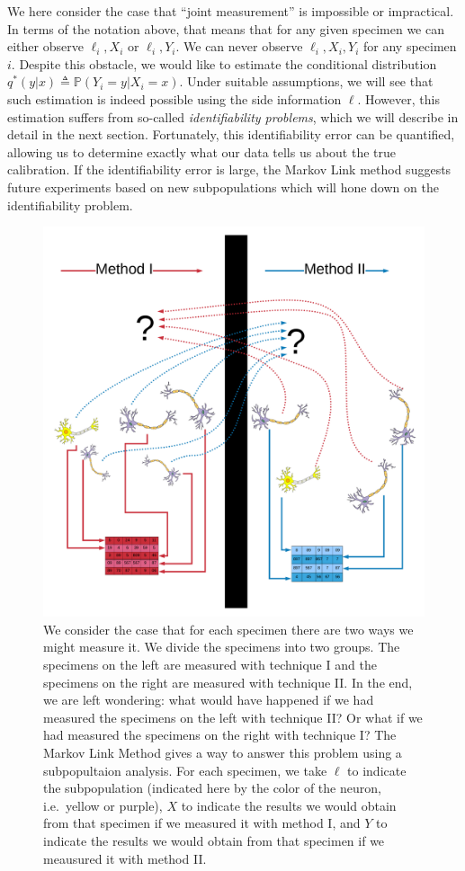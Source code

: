 We here consider the case that ``joint measurement'' is impossible or impractical.  In terms of the notation above, that means that for any given specimen we can either observe $\ell_i, X_i$ or $\ell_i,Y_i$.  We can never observe $\ell_i,X_i,Y_i$ for any specimen $i$.  Despite this obstacle, we would like to estimate the conditional distribution $q^*(y|x)\triangleq \mathbb{P}(Y_i=y|X_i=x)$.  Under suitable assumptions, we will see that such estimation is indeed possible using the side information $\ell$.  However, this estimation suffers from so-called \emph{identifiability problems}, which we will describe in detail in the next section.  Fortunately, this identifiability error can be quantified, allowing us to determine exactly what our data tells us about the true calibration.  If the identifiability error is large, the Markov Link method suggests future experiments based on new subpopulations which will hone down on the identifiability problem.

\begin{figure}
\hfill{}\includegraphics[width=.7\textwidth]{../images/bigpicture}\hfill{}
\caption{We consider the case that for each specimen there are two ways we might measure it.  We divide the specimens into two groups.  The specimens on the left are measured with technique I and the specimens on the right are measured with technique II.  In the end, we are left wondering: what would have happened if we had measured the specimens on the left with technique II?  Or what if we had measured the specimens on the right with technique I?  The Markov Link Method gives a way to answer this problem using a subpopultaion analysis.  For each specimen, we take $\ell$ to indicate the subpopulation (indicated here by the color of the neuron, i.e.\ yellow or purple), $X$ to indicate the results we would obtain from that specimen if we measured it with method I, and $Y$ to indicate the results we would obtain from that specimen if we meausured it with method II. \label{fig:bigpicture}}
\end{figure}

